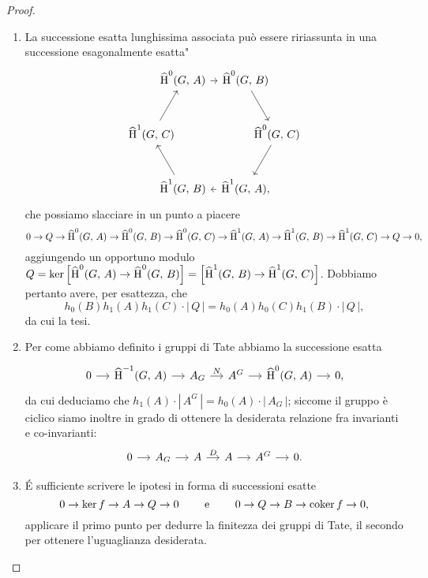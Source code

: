 \begin{proof}
	\begin{enumerate}
		\item La successione esatta lunghissima associata può essere ririassunta in una successione \leftquote esagonalmente esatta"
		\[\begin{tikzcd}[column sep={1cm,between origins}, row sep={1.732050808cm,between origins}]
			& \Hh^0(G, \, A) \arrow[rr] && \Hh^0(G, \, B) \arrow[rd] &  \\
			\Hh^1(G, \, C) \arrow[ru]&  &&  & \Hh^0(G, \, C) \arrow[ld] \\				& \Hh^1(G, \, B) \arrow[lu] && \Hh^1(G, \, A) \arrow[ll], & 
		\end{tikzcd}\]
		che possiamo slacciare in un punto a piacere \todo[su]
		\[ 0 \to Q \to \operatorname{\widehat{H}}^0(G, \, A) \to \operatorname{\widehat{H}}^0(G, \, B) \to \operatorname{\widehat{H}}^0(G, \, C) \to \operatorname{\widehat{H}}^1(G, \, A) \to \operatorname{\widehat{H}}^1(G, \, B) \to \operatorname{\widehat{H}}^1(G, \, C) \to Q \to 0, \]
		aggiungendo un opportuno modulo $ Q = \ker \left[\operatorname{\widehat{H}}^0(G, \, A) \to \operatorname{\widehat{H}}^0(G, \, B)\right] = \left[ \operatorname{\widehat{H}}^1(G, \, B) \to \operatorname{\widehat{H}}^1(G, \, C) \right] $.
		Dobbiamo pertanto avere, per esattezza, che
		\[  h_0(B) h_1(A) h_1(C) \cdot |\,Q\,| = h_0(A) h_0(C) h_1(B) \cdot |\,Q\,|, \]			da cui la tesi.
		
		\item Per come abbiamo definito i gruppi di Tate abbiamo la successione esatta
		\begin{equation*}			\begin{tikzcd}[column sep = small]
			0 \rar& \Hh^{-1}(G, \, A) \rar& A_G \rar["N"]& A^G \rar&\Hh^0(G, \, A) \rar& 0,
			\end{tikzcd}
		\end{equation*}
		da cui deduciamo che $ h_1(A) \cdot |\, A^G\, | =  h_0(A) \cdot |\, A_G\, | $; siccome il gruppo è ciclico siamo inoltre in grado di ottenere la desiderata relazione fra invarianti e co-invarianti:
		\begin{equation*}
		\begin{tikzcd}[column sep = small]
			0 \rar& A_G \rar& A \rar["D"]& A \rar& A^G \rar& 0.
			\end{tikzcd}
		\end{equation*}
		\item É sufficiente scrivere le ipotesi in forma di successioni esatte
		\[ 0 \to \ker f \to A \to Q \to 0 \qquad\text{ e } \qquad 0 \to Q \to B \to \operatorname{coker} f \to 0, \]
		applicare il primo punto per dedurre la finitezza dei gruppi di Tate, il secondo per ottenere l'uguaglianza desiderata.
	\end{enumerate}
\end{proof}

